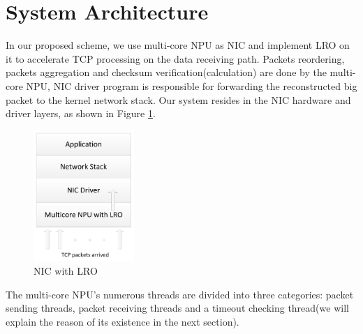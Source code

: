 \documentclass[conference]{IEEEtran}
\begin{document}
\section{System Architecture}
In our proposed scheme, we use multi-core NPU as NIC and implement LRO on it to accelerate TCP processing on the data receiving path. Packets reordering, packets aggregation and checksum verification(calculation) are done by the multi-core NPU, NIC driver program is responsible for forwarding the reconstructed big packet to the kernel network stack. Our system resides in the NIC hardware and driver layers, as shown in Figure \ref{nic_with_lro}.
\begin{figure}[!t]
\centering
\includegraphics[width=1.5in]{nic_with_lro}
\caption{NIC with LRO}
\label{nic_with_lro}
\end{figure}

The multi-core NPU's numerous threads are divided into three categories: packet sending threads, packet receiving threads and a timeout checking thread(we will explain the reason of its existence in the next section).
\end{document}
